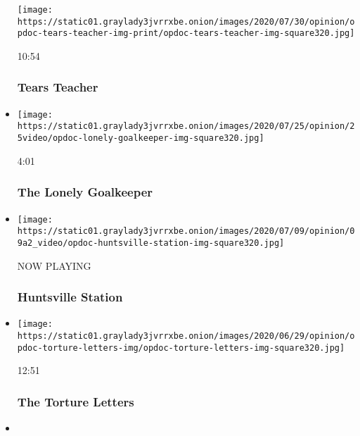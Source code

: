 \begin{itemize}
  \texttt{[image: https://static01.graylady3jvrrxbe.onion/images/2020/07/30/opinion/opdoc-tears-teacher-img-print/opdoc-tears-teacher-img-square320.jpg]}

  10:54

  \hypertarget{tears-teacher}{%
  \subsubsection{Tears Teacher}\label{tears-teacher}}
\item
  \href{https://www.nytimes3xbfgragh.onion/video/opinion/100000007229285/the-lonely-goalkeeper.html?action=click\&module=video-series-bar\&region=header\&pgtype=Article\&playlistId=video/op-docs}{}

  \texttt{[image: https://static01.graylady3jvrrxbe.onion/images/2020/07/25/opinion/25video/opdoc-lonely-goalkeeper-img-square320.jpg]}

  4:01

  \hypertarget{the-lonely-goalkeeper}{%
  \subsubsection{The Lonely Goalkeeper}\label{the-lonely-goalkeeper}}
\item
  \texttt{[image: https://static01.graylady3jvrrxbe.onion/images/2020/07/09/opinion/09a2\_video/opdoc-huntsville-station-img-square320.jpg]}

  NOW PLAYING

  \hypertarget{huntsville-station-2}{%
  \subsubsection{Huntsville Station}\label{huntsville-station-2}}
\item
  \href{https://www.nytimes3xbfgragh.onion/video/opinion/100000007205588/the-torture-letters.html?action=click\&module=video-series-bar\&region=header\&pgtype=Article\&playlistId=video/op-docs}{}

  \texttt{[image: https://static01.graylady3jvrrxbe.onion/images/2020/06/29/opinion/opdoc-torture-letters-img/opdoc-torture-letters-img-square320.jpg]}

  12:51

  \hypertarget{the-torture-letters}{%
  \subsubsection{The Torture Letters}\label{the-torture-letters}}
\item
  \href{https://www.nytimes3xbfgragh.onion/video/opinion/100000007172575/forgiveness-day.html?action=click\&module=video-series-bar\&region=header\&pgtype=Article\&playlistId=video/op-docs}{}


\end{itemize}
